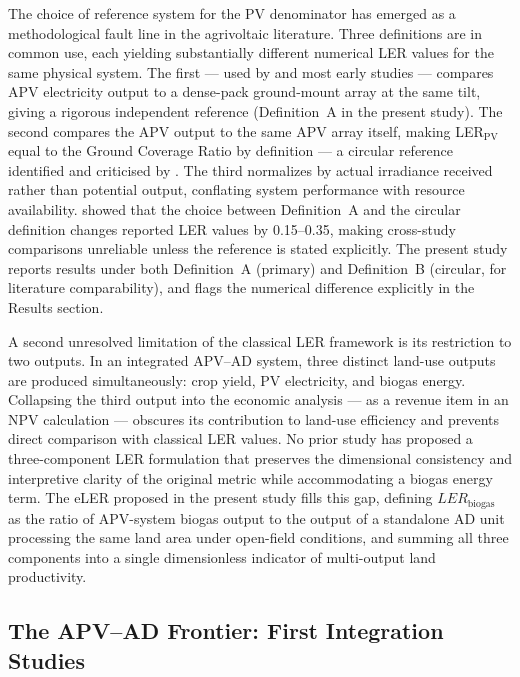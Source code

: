 The choice of reference system for the PV denominator has emerged
as a methodological fault line in the agrivoltaic literature.
Three definitions are in common use, each yielding substantially
different numerical LER values for the same physical system.
The first --- used by \citet{dupraz2011} and most early studies
--- compares APV electricity output to a dense-pack ground-mount
array at the same tilt, giving a rigorous independent reference
(Definition~A in the present study). The second compares the APV
output to the same APV array itself, making LER$_{\text{PV}}$
equal to the Ground Coverage Ratio by definition --- a circular
reference identified and criticised by \citet{mazzeo2025}.
The third normalizes by actual irradiance received rather than
potential output, conflating system performance with resource
availability. \citet{mazzeo2025} showed that the choice between
Definition~A and the circular definition changes reported LER
values by 0.15--0.35, making cross-study comparisons unreliable
unless the reference is stated explicitly. The present study
reports results under both Definition~A (primary) and
Definition~B (circular, for literature comparability), and
flags the numerical difference explicitly in the Results section.

A second unresolved limitation of the classical LER framework is
its restriction to two outputs. In an integrated APV--AD system,
three distinct land-use outputs are produced simultaneously:
crop yield, PV electricity, and biogas energy. Collapsing the
third output into the economic analysis --- as a revenue item
in an NPV calculation --- obscures its contribution to land-use
efficiency and prevents direct comparison with classical LER
values. No prior study has proposed a three-component LER
formulation that preserves the dimensional consistency and
interpretive clarity of the original metric while accommodating
a biogas energy term. The eLER proposed in the present study
fills this gap, defining $LER_{\text{biogas}}$ as the ratio of
APV-system biogas output to the output of a standalone AD unit
processing the same land area under open-field conditions, and
summing all three components into a single dimensionless indicator
of multi-output land productivity.


\subsection{The APV--AD Frontier: First Integration Studies}

